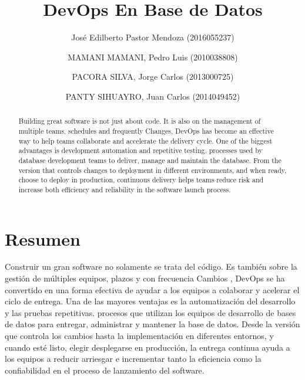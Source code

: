 \documentclass[preprint,12pt]{elsarticle}
\begin{document}
	


	\begin{frontmatter}

		\title{\huge  DevOps En Base de Datos}
		
		\author{José Edilberto Pastor Mendoza              (2016055237)}
		\author{MAMANI MAMANI, Pedro Luis              (2010038808)}
		\author{PACORA SILVA, Jorge Carlos                   (2013000725)}
		\author{PANTY SIHUAYRO, Juan Carlos               (2014049452)}
		
		\address{Tacna, Perú}
		
		\begin{abstract}
			
Building great software is not just about code. It is also on the management of multiple teams, schedules and frequently Changes, DevOps has become an effective way to help teams collaborate and accelerate the delivery cycle. One of the biggest advantages is development automation and repetitive testing. processes used by database development teams to deliver, manage and maintain the database. From the version that controls changes to deployment in different environments, and when ready, choose to deploy in production, continuous delivery helps teams reduce risk and increase both efficiency and reliability in the software launch process.


		\end{abstract}
\end{frontmatter}

	\section{Resumen}

Construir un gran software no solamente se trata del código. Es también 
sobre la gestión de múltiples equipos, plazos y con frecuencia
Cambios , DevOps se ha convertido en una forma efectiva de ayudar a los equipos a colaborar y acelerar el ciclo de entrega.
Una de las mayores ventajas es la automatización del desarrollo y las pruebas repetitivas.
procesos que utilizan los equipos de desarrollo de bases de datos para entregar, administrar y mantener la base de datos. Desde la versión que controla los cambios hasta la implementación en diferentes entornos, y cuando esté listo, elegir desplegarse en producción, la entrega continua ayuda a los equipos a reducir
arriesgar e incrementar tanto la eficiencia como la confiabilidad en el proceso de lanzamiento del software.
\end{document}
